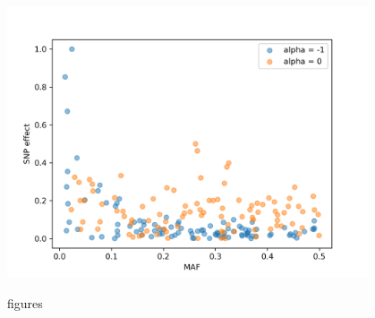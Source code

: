 \documentclass[sn-nature]{sn-jnl}%
\begin{document}
\begin{figure}
  \begin{center}
    \includegraphics[width=0.95\textwidth]{figures/simmedSNPeffects.png} \\ 
  \end{center}
  \caption{figures}
  \label{fig:all_figures}
\end{figure}
\end{document}
